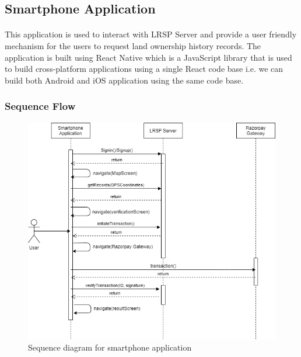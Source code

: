 \documentclass{article}
\begin{document}
    \subsection{Smartphone Application}
        \paragraph{}
        This application is used to interact with LRSP Server and provide a user friendly mechanism for the users to request land ownership history records.
        The application is built using React Native which is a JavaScript library that is used to build cross-platform applications using a single React code base i.e. we can build both Android and iOS application using the same code base. 
        
        \subsubsection{Sequence Flow}
        \begin{figure}[htbp]
            \includegraphics[scale=0.5]{app_sequence}
            \centering
            \caption{Sequence diagram for smartphone application}
        \end{figure}
\end{document}
